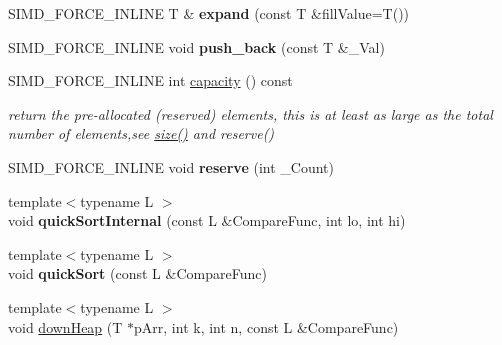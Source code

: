 \begin{DoxyCompactItemize}
\item 
\hypertarget{classbt_aligned_object_array_ad64affb4ed3f9db81f832cbac6b62527}{S\+I\+M\+D\+\_\+\+F\+O\+R\+C\+E\+\_\+\+I\+N\+L\+I\+N\+E T \& {\bfseries expand} (const T \&fill\+Value=T())}\label{classbt_aligned_object_array_ad64affb4ed3f9db81f832cbac6b62527}

\item 
\hypertarget{classbt_aligned_object_array_ad61e10166e2c00f487095d3482b9edd1}{S\+I\+M\+D\+\_\+\+F\+O\+R\+C\+E\+\_\+\+I\+N\+L\+I\+N\+E void {\bfseries push\+\_\+back} (const T \&\+\_\+\+Val)}\label{classbt_aligned_object_array_ad61e10166e2c00f487095d3482b9edd1}

\item 
\hypertarget{classbt_aligned_object_array_afcfda91263ff04e1efcbe62bf68e2d1d}{S\+I\+M\+D\+\_\+\+F\+O\+R\+C\+E\+\_\+\+I\+N\+L\+I\+N\+E int \hyperlink{classbt_aligned_object_array_afcfda91263ff04e1efcbe62bf68e2d1d}{capacity} () const }\label{classbt_aligned_object_array_afcfda91263ff04e1efcbe62bf68e2d1d}

\begin{DoxyCompactList}\small\item\em return the pre-\/allocated (reserved) elements, this is at least as large as the total number of elements,see \hyperlink{classbt_aligned_object_array_a6bdd14c7599ecb95e8d83dd5a715f9b7}{size()} and reserve() \end{DoxyCompactList}\item 
\hypertarget{classbt_aligned_object_array_a0bcdc850355c6742c66d50b16b102d9d}{S\+I\+M\+D\+\_\+\+F\+O\+R\+C\+E\+\_\+\+I\+N\+L\+I\+N\+E void {\bfseries reserve} (int \+\_\+\+Count)}\label{classbt_aligned_object_array_a0bcdc850355c6742c66d50b16b102d9d}

\item 
\hypertarget{classbt_aligned_object_array_afd02193777d3644c1202bd430cd47ec3}{{\footnotesize template$<$typename L $>$ }\\void {\bfseries quick\+Sort\+Internal} (const L \&Compare\+Func, int lo, int hi)}\label{classbt_aligned_object_array_afd02193777d3644c1202bd430cd47ec3}

\item 
\hypertarget{classbt_aligned_object_array_a96e9890d9c406d43b53b0e5ff0723b2f}{{\footnotesize template$<$typename L $>$ }\\void {\bfseries quick\+Sort} (const L \&Compare\+Func)}\label{classbt_aligned_object_array_a96e9890d9c406d43b53b0e5ff0723b2f}

\item 
\hypertarget{classbt_aligned_object_array_af763a60de2f11089bb10ebff2c062642}{{\footnotesize template$<$typename L $>$ }\\void \hyperlink{classbt_aligned_object_array_af763a60de2f11089bb10ebff2c062642}{down\+Heap} (T $\ast$p\+Arr, int k, int n, const L \&Compare\+Func)}\label{classbt_aligned_object_array_af763a60de2f11089bb10ebff2c062642}


\end{DoxyCompactItemize}

